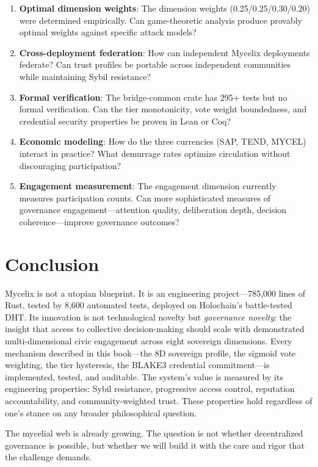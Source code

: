 \documentclass[12pt]{book}
\begin{document}
\begin{enumerate}
  \item \textbf{Optimal dimension weights}: The dimension weights
    (0.25/0.25/0.30/0.20) were determined empirically. Can game-theoretic
    analysis produce provably optimal weights against specific attack models?
  \item \textbf{Cross-deployment federation}: How can independent Mycelix
    deployments federate? Can trust profiles be portable across
    independent communities while maintaining Sybil resistance?
  \item \textbf{Formal verification}: The bridge-common crate has 295+ tests
    but no formal verification. Can the tier monotonicity, vote weight
    boundedness, and credential security properties be proven in Lean or Coq?
  \item \textbf{Economic modeling}: How do the three currencies (SAP, TEND,
    MYCEL) interact in practice? What demurrage rates optimize circulation
    without discouraging participation?
  \item \textbf{Engagement measurement}: The engagement dimension currently
    measures participation counts. Can more sophisticated measures of
    governance engagement---attention quality, deliberation depth, decision
    coherence---improve governance outcomes?
\end{enumerate}

\section{Conclusion}

Mycelix is not a utopian blueprint. It is an engineering project---785,000 lines
of Rust, tested by 8,600 automated tests, deployed on Holochain's battle-tested
DHT. Its innovation is not technological novelty but \emph{governance novelty}:
the insight that access to collective decision-making should scale with
demonstrated multi-dimensional civic engagement across eight sovereign dimensions. Every
mechanism described in this book---the 8D sovereign profile, the sigmoid vote weighting,
the tier hysteresis, the BLAKE3 credential commitment---is implemented, tested,
and auditable. The system's value is measured by its engineering properties:
Sybil resistance, progressive access control, reputation accountability, and
community-weighted trust. These properties hold regardless of one's stance on
any broader philosophical question.

The mycelial web is already growing. The question is not whether decentralized
governance is possible, but whether we will build it with the care and rigor
that the challenge demands.
\end{document}
